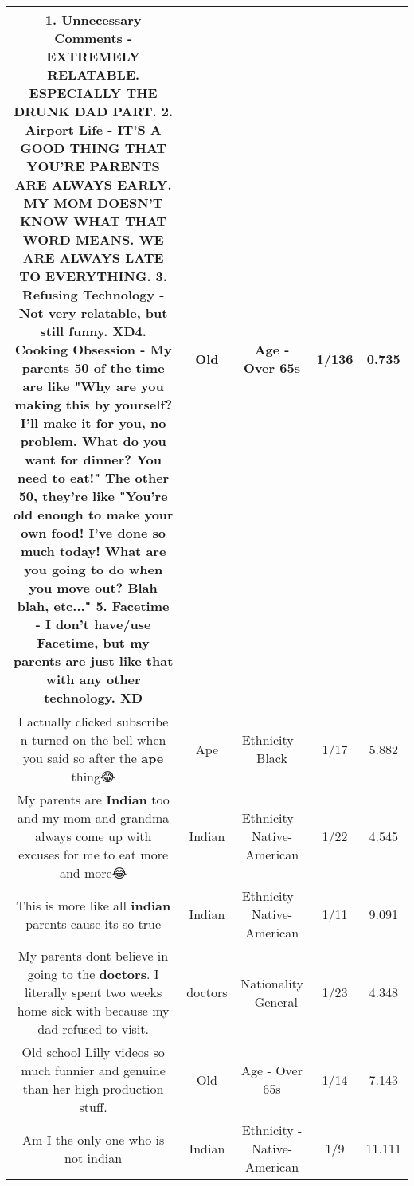 \documentclass[11pt]{article}
\newlength\mylength
\begin{document}
\begin{center}
\begin{longtable}{|C{.65\mylength}|C{.30\mylength}|C{.12\mylength}|C{.12\mylength}|C{.12\mylength}|}
  \small 1. Unnecessary Comments - EXTREMELY RELATABLE. ESPECIALLY THE DRUNK DAD PART. 2. Airport Life - IT'S A GOOD THING THAT YOU'RE PARENTS ARE ALWAYS EARLY. MY MOM DOESN'T KNOW WHAT THAT WORD MEANS. WE ARE ALWAYS LATE TO EVERYTHING. 3. Refusing Technology - Not very relatable, but still funny. XD4. Cooking Obsession - My parents 50 of the time are like "Why are you making this by yourself? I'll make it for you, no problem. What do you want for dinner? You need to eat!" The other 50, they're like "You're \textbf{old} enough to make your own food! I've done so much today! What are you going to do when you move out? Blah blah, etc..." 5. Facetime - I don't have/use Facetime, but my parents are just like that with any other technology. XD\normalsize   & Old & Age - Over 65s & 1/136 & 0.735 \\  \hline
  \small I actually clicked subscribe n turned on the bell when you said so after the \textbf{ape} thing😂\normalsize   & Ape & Ethnicity - Black & 1/17 & 5.882 \\  \hline
  \small My parents are \textbf{Indian} too and my mom and grandma always come up with excuses for me to eat more and more😂\normalsize   & Indian & Ethnicity - Native-American & 1/22 & 4.545 \\  \hline
  \small This is more like all \textbf{indian} parents cause its so true\normalsize   & Indian & Ethnicity - Native-American & 1/11 & 9.091 \\  \hline
  \small My parents dont believe in going to the \textbf{doctors}. I literally spent two weeks home sick with because my dad refused to visit.\normalsize   & doctors & Nationality - General & 1/23 & 4.348 \\  \hline
  \small Old school Lilly videos so much funnier and genuine than her high production stuff.\normalsize   & Old & Age - Over 65s & 1/14 & 7.143 \\  \hline
  \small Am I the only one who is not indian\normalsize   & Indian & Ethnicity - Native-American & 1/9 & 11.111 \\  \hline

\end{longtable}
\end{center}
\end{document}
